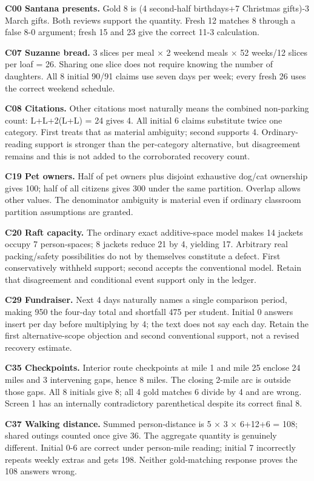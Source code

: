 \documentclass[12pt,a4paper]{report}
\begin{document}
\textbf{C00 Santana presents.} Gold 8 is (4 second-half birthdays+7
Christmas gifts)-3 March gifts. Both reviews support the quantity. Fresh
12 matches 8 through a false 8-0 argument; fresh 15 and 23 give the
correct 11-3 calculation.

\textbf{C07 Suzanne bread.} 3 slices per meal × 2 weekend meals × 52
weeks/12 slices per loaf = 26. Sharing one slice does not require
knowing the number of daughters. All 8 initial 90/91 claims use seven
days per week; every fresh 26 uses the correct weekend schedule.

\textbf{C08 Citations.} Other citations most naturally means the
combined non-parking count: L+L+2(L+L) = 24 gives 4. All initial 6
claims substitute twice one category. First treats that as material
ambiguity; second supports 4. Ordinary-reading support is stronger than
the per-category alternative, but disagreement remains and this is not
added to the corroborated recovery count.

\textbf{C19 Pet owners.} Half of pet owners plus disjoint exhaustive
dog/cat ownership gives 100; half of all citizens gives 300 under the
same partition. Overlap allows other values. The denominator ambiguity
is material even if ordinary classroom partition assumptions are
granted.

\textbf{C20 Raft capacity.} The ordinary exact additive-space model
makes 14 jackets occupy 7 person-spaces; 8 jackets reduce 21 by 4,
yielding 17. Arbitrary real packing/safety possibilities do not by
themselves constitute a defect. First conservatively withheld support;
second accepts the conventional model. Retain that disagreement and
conditional event support only in the ledger.

\textbf{C29 Fundraiser.} Next 4 days naturally names a single comparison
period, making 950 the four-day total and shortfall 475 per student.
Initial 0 answers insert per day before multiplying by 4; the text does
not say each day. Retain the first alternative-scope objection and
second conventional support, not a revised recovery estimate.

\textbf{C35 Checkpoints.} Interior route checkpoints at mile 1 and mile
25 enclose 24 miles and 3 intervening gaps, hence 8 miles. The closing
2-mile arc is outside those gaps. All 8 initials give 8; all 4 gold
matches 6 divide by 4 and are wrong. Screen 1 has an internally
contradictory parenthetical despite its correct final 8.

\textbf{C37 Walking distance.} Summed person-distance is 5 × 3 × 6+12+6
= 108; shared outings counted once give 36. The aggregate quantity is
genuinely different. Initial 0-6 are correct under person-mile reading;
initial 7 incorrectly repeats weekly extras and gets 198. Neither
gold-matching response proves the 108 answers wrong.
\end{document}

